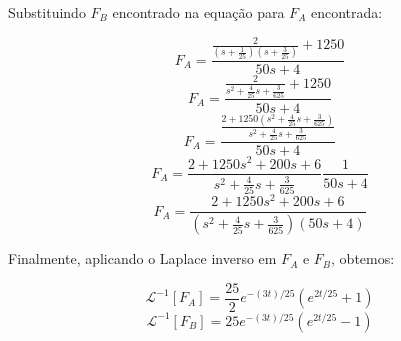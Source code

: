 \documentclass[12pt]{article}%
\newcommand{\newpara}
    {
    \vskip 0.5cm
    }
\begin{document}
    \newpara
    Substituindo \(F_{B}\) encontrado na equação para \(F_{A}\) encontrada:
    
    \[F_{A} = \frac{\frac{2}{(s + \frac{1}{25})(s + \frac{3}{25})} + 1250}{50s + 4}\]
    \[F_{A} = \frac{\frac{2}{s^2 + \frac{4}{25}s + \frac{3}{625}} + 1250}{50s + 4}\]
    \[F_{A} = \frac{\frac{2 + 1250(s^2 + \frac{4}{25}s + \frac{3}{625})}{s^2 + \frac{4}{25}s + \frac{3}{625}}}{50s + 4}\]
    \[F_{A} = \frac{2 + 1250s^2 + 200s + 6}{s^2 + \frac{4}{25}s + \frac{3}{625}} \frac{1}{50s + 4}\]
    \[F_{A} = \frac{2 + 1250s^2 + 200s + 6}{(s^2 + \frac{4}{25}s + \frac{3}{625})(50s + 4)}\]
    
    \newpara
    Finalmente, aplicando o Laplace inverso em \(F_{A}\) e \(F_{B}\), obtemos:
    
    \[\mathcal{L}^{-1}[F_{A}] = \frac{25}{2}e^{-(3t)/25}(e^{2t/25} + 1)\]
    \[\mathcal{L}^{-1}[F_{B}] = 25e^{-(3t)/25}(e^{2t/25} - 1)\]

    \newpage
\end{document}
